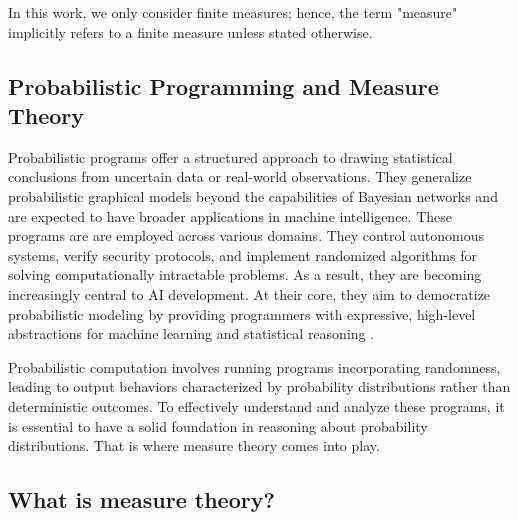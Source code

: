 In this work, we only consider finite measures; hence, the term "measure" implicitly refers to a finite measure unless stated otherwise.




\subsection{Probabilistic Programming and Measure Theory}


Probabilistic programs offer a structured approach to drawing statistical conclusions from uncertain data or real-world observations. They generalize probabilistic graphical models beyond the capabilities of Bayesian networks and are expected to have broader applications in machine intelligence. These programs are are employed across various domains. They control autonomous systems, verify security protocols, and implement randomized algorithms for solving computationally intractable problems. As a result, they are becoming increasingly central to AI development. At their core, they aim to democratize probabilistic modeling by providing programmers with expressive, high-level abstractions for machine learning and statistical reasoning \cite{bartheFoundationsProbabilisticProgramming2020}. 



Probabilistic computation involves running programs incorporating randomness, leading to output behaviors characterized by probability distributions rather than deterministic outcomes. To effectively understand and analyze these programs, it is essential to have a solid foundation in reasoning about probability distributions. That is where measure theory comes into play.

\subsection{What is measure theory?}


